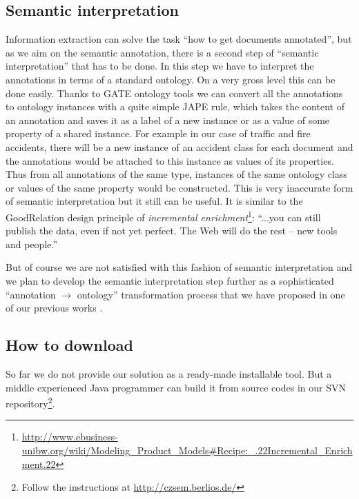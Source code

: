 \documentclass[runningheads,a4paper]{llncs}
\begin{document}
\subsection{Semantic interpretation}
\label{sec:SemanticInterpretation}
Information extraction can solve the task ``how to get documents annotated'', but as we aim on the semantic annotation, there is a second step of ``semantic interpretation'' that has to be done. In this step we have to interpret the annotations in terms of a standard ontology. On a very gross level this can be done easily. Thanks to GATE ontology tools \cite{Bon04b} we can convert all the annotations to ontology instances with a quite simple JAPE \cite{Cunningham00jape:a} rule, which takes the content of an annotation and saves it as a label of a new instance or as a value of some property of a shared instance. For example in our case of traffic and fire accidents, there will be a new instance of an accident class for each document and the annotations would be attached to this instance as values of its properties. Thus from all annotations of the same type, instances of the same ontology class or values of the same property would be constructed. This is very inaccurate form of semantic interpretation but it still can be useful. It is similar to the GoodRelation \cite{DBLP:conf/ekaw/Hepp08} design principle of \emph{incremental enrichment}\footnote{\url{http://www.ebusiness-unibw.org/wiki/Modeling_Product_Models#Recipe:_.22Incremental_Enrichment.22}}:
``...you can still publish the data, even if not yet perfect. The Web will do the rest -- new tools and people.''	

But of course we are not satisfied with this fashion of semantic interpretation and we plan to develop the semantic interpretation step further as a sophisticated ``annotation $\rightarrow$ ontology'' transformation process that we have proposed in one of our previous works \cite{biblio:DeVoComputingaggregations2008}.

\subsection{How to download}
So far we do not provide our solution as a ready-made installable tool. But a middle experienced Java programmer can build it from source codes in our SVN repository\footnote{Follow the instructions at \url{http://czsem.berlios.de/}}.
\end{document}
